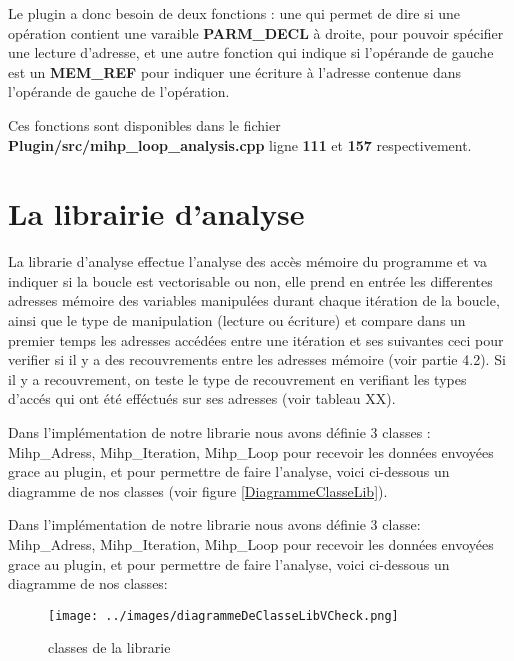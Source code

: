 \documentclass[12pt,french]{article}
\begin{document}
Le plugin a donc besoin de deux fonctions : une qui permet de dire si une opération contient une varaible \textbf{PARM\_DECL} à droite, pour pouvoir spécifier une lecture d'adresse, et une autre fonction qui indique si l'opérande de gauche est un \textbf{MEM\_REF} pour indiquer une écriture à l'adresse contenue dans l'opérande de gauche de l'opération.

Ces fonctions sont disponibles dans le fichier \textbf{Plugin/src/mihp\_loop\_analysis.cpp} ligne \textbf{111} et \textbf{157} respectivement.

\section{\color{blue}La librairie d'analyse}

La librarie d'analyse effectue l'analyse des accès mémoire du programme et va indiquer si la boucle est vectorisable ou non, elle prend en entrée les differentes adresses mémoire des variables manipulées durant chaque itération de la boucle, ainsi que le type de manipulation (lecture ou écriture) et compare dans un premier temps les adresses accédées entre une itération et ses suivantes ceci pour verifier si il y a des recouvrements entre les adresses mémoire (voir partie 4.2). Si il y a recouvrement, on teste le type de recouvrement en verifiant les types d'accés qui ont été efféctués sur ses adresses (voir tableau XX).

Dans l'implémentation de notre librarie nous avons définie 3 classes : Mihp\_Adress, Mihp\_Iteration, Mihp\_Loop pour recevoir les données envoyées grace au plugin, et pour permettre de faire l'analyse, voici ci-dessous un diagramme de nos classes (voir figure \ref{DiagrammeClasseLib}).


Dans l'implémentation de notre librarie nous avons définie 3 classe: Mihp\_Adress, Mihp\_Iteration, Mihp\_Loop pour recevoir les données envoyées grace au plugin, et pour permettre de faire l'analyse, voici ci-dessous un diagramme de nos classes: 
\begin{figure} %
	\begin{center}
		\texttt{[image: ../images/diagrammeDeClasseLibVCheck.png]}
	\end{center}
	\caption{ classes de la librarie}
	\label{classes de la librairie}
\end{figure}

\end{document}
